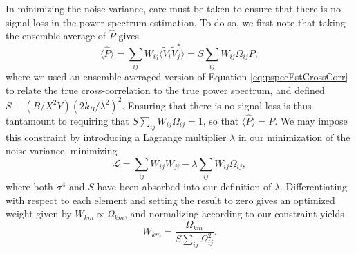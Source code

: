 \documentclass[twocolumn,apj,numberedappendix]{emulateapj}
\begin{document}
In minimizing the noise variance, care must be taken to ensure that there is no signal loss in the power spectrum estimation. To do so, we first note that taking the ensemble average of $\widehat{P}$ gives
\begin{equation}
\langle \widehat{P} \rangle = \sum_{ij} W_{ij} \langle \widetilde{V}_i \widetilde{V}_j^* \rangle = S \sum_{ij} W_{ij} \Omega_{ij} P,
\end{equation}
where we used an ensemble-averaged version of Equation \eqref{eq:pspecEstCrossCorr} to relate the true cross-correlation to the true power spectrum, and defined $S \equiv ( B / X^2 Y) ( 2 k_B / \lambda^2 )^2$. Ensuring that there is no signal loss is thus tantamount to requiring that $ S \sum_{ij} W_{ij} \Omega_{ij} =1$, so that $\langle \widehat{P} \rangle = P$. We may impose this constraint by introducing a Lagrange multiplier $\lambda$ in our minimization of the noise variance, minimizing
\begin{equation}
\mathcal L = \sum_{ij} W_{ij} W_{ji} - \lambda \sum_{ij} W_{ij} \Omega_{ij},
\end{equation}
where both $\sigma^4$ and $S$ have been absorbed into our definition of $\lambda$. Differentiating with respect to each element and setting the result to zero gives an optimized weight given by $W_{km} \propto \Omega_{km}$, and normalizing according to our constraint yields
\begin{equation}
W_{km} = \frac{\Omega_{km}}{S \sum_{ij} \Omega_{ij}^2}.
\end{equation}
\end{document}

